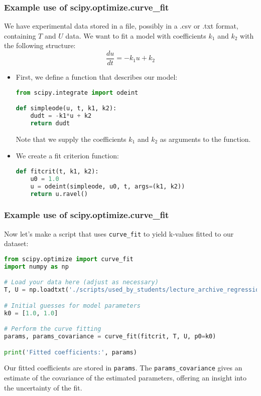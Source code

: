   \begin{frame}[fragile] 
    \frametitle{Example use of scipy.optimize.curve\_fit}
    We have experimental data stored in a file, possibly in a .csv or .txt format, containing $T$ and $U$ data. We want to fit a model with coefficients $k_1$ and $k_2$ with the following structure:
    \[
      \frac{du}{dt} = -k_1 u + k_2
    \]
    \pause
    \begin{itemize}
      \item First, we define a function that describes our model:
      \begin{lstlisting}[language=Python,basicstyle=\scriptsize]
from scipy.integrate import odeint

def simpleode(u, t, k1, k2):
    dudt = -k1*u + k2
    return dudt
      \end{lstlisting}
      Note that we supply the coefficients \(k_1\) and \(k_2\) as arguments to the function.
      \pause
      \item We create a fit criterion function:
      \begin{lstlisting}[language=Python,basicstyle=\scriptsize]
def fitcrit(t, k1, k2):
    u0 = 1.0
    u = odeint(simpleode, u0, t, args=(k1, k2))
    return u.ravel()
      \end{lstlisting}
    \end{itemize}
    \end{frame}
    
    \begin{frame}[fragile] 
    \frametitle{Example use of scipy.optimize.curve\_fit}
    Now let's make a script that uses \lstinline$curve_fit$ to yield k-values fitted to our dataset:
    \pause
    \begin{lstlisting}[language=Python,basicstyle=\scriptsize]
from scipy.optimize import curve_fit
import numpy as np

# Load your data here (adjust as necessary)
T, U = np.loadtxt('./scripts/used_by_students/lecture_archive_regression_optim/tudataset1.txt', unpack=True, skiprows=1)

# Initial guesses for model parameters
k0 = [1.0, 1.0]

# Perform the curve fitting
params, params_covariance = curve_fit(fitcrit, T, U, p0=k0)

print('Fitted coefficients:', params)
    \end{lstlisting}
    Our fitted coefficients are stored in \lstinline|params|. The \lstinline|params_covariance| gives an estimate of the covariance of the estimated parameters, offering an insight into the uncertainty of the fit.
    \end{frame}      

